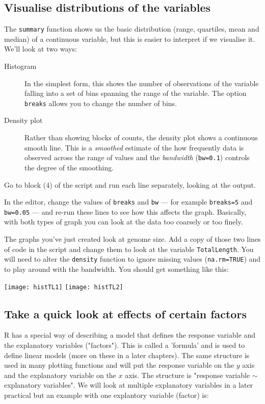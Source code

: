 \subsection{Visualise distributions of the variables}
The {\tt summary} function shows us the basic distribution (range, 
quartiles, mean and median) of a continuous variable, but this is 
easier to interpret if we visualise it. We'll look at two ways: 
\begin{description}
    \item [Histogram] In the simplest form, this shows the number of 
    observations of the variable falling into a set of bins spanning 
    the range of the variable. The option {\tt breaks} allows you to 
    change the number of bins.
    \item [Density plot] Rather than showing blocks of counts, the 
    density plot shows a continuous smooth line. This is a {\it 
    smoothed} estimate of the how frequently data is observed across 
    the range of values and the {\it bandwidth} ({\tt bw=0.1}) controls 
    the degree of the smoothing.
\end{description}
 
\begin{compactitem}[$\quad\star$]
\item Go to block (4) of the script and run each line separately, 
looking at the output. 
\item In the editor, change the values of {\tt breaks} and {\tt bw} --- 
for example {\tt breaks=5} and {\tt bw=0.05} --- and re-run these lines 
to see how this affects the graph. Basically, with both types of graph 
you can look at the data too coarsely or too finely.
\item The graphs you've just created look at genome size. Add a copy of 
those two lines of code in the script and change them to look at the 
variable {\tt TotalLength}. You will need to alter the {\tt density} 
function to ignore missing values ({\tt na.rm=TRUE}) and to play around 
with the bandwidth. You should get something like this: 
\end{compactitem}
% 
\begin{center}
\texttt{[image: histTL1]}
\texttt{[image: histTL2]} 
\end{center}
 
\subsection{Take a quick look at effects of certain factors}
R has a special way of describing a model that defines the response 
variable and the explanatory variables ("factors"). This is called a 
'formula' and is used to define linear models (more on these in a later 
chapters). The same structure is used in many plotting functions and 
will put the response variable on the $y$ axis and the explanatory 
variable on the $x$ axis. The structure is "response variable $\sim$ 
explanatory variables". We will look at multiple explanatory variables 
in a later practical but an example with one explantory variable 
(factor) is:

